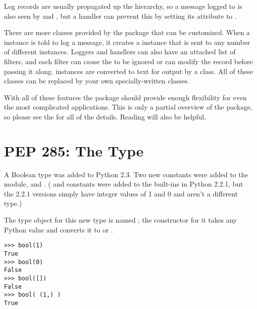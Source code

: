 \documentclass{howto}
\begin{document}
Log records are usually propagated up the hierarchy, so a message
logged to  is also seen by  and
, but a handler can prevent this by setting its
 attribute to .

There are more classes provided by the  package that
can be customized.  When a  instance is told to log a
message, it creates a  instance that is sent to any
number of different  instances.  Loggers and handlers
can also have an attached list of filters, and each filter can cause
the  to be ignored or can modify the record before
passing it along.   instances are converted to text
for output by a  class.  All of these classes can be
replaced by your own specially-written classes.

With all of these features the  package should provide
enough flexibility for even the most complicated applications.  This
is only a partial overview of the  package, so please
see the  for all of the details.
Reading  will also be helpful.


\begin{seealso}


\end{seealso}


\section{PEP 285: The  Type\label{section-bool}}

A Boolean type was added to Python 2.3.  Two new constants were added
to the  module,  and
.  ( and
 constants were added to the built-ins
in Python 2.2.1, but the 2.2.1 versions simply have integer values of
1 and 0 and aren't a different type.)

The type object for this new type is named
; the constructor for it takes any Python value and
converts it to  or .

\begin{verbatim}
>>> bool(1)
True
>>> bool(0)
False
>>> bool([])
False
>>> bool( (1,) )
True
\end{verbatim}
\end{document}
